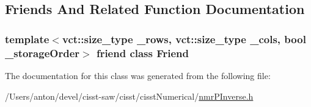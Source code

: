\subsection{Friends And Related Function Documentation}
\hypertarget{classnmr_p_inverse_fixed_size_data_a7f8321d57e81bc613d5dbef3410ba70e}{}
\subsubsection[{Friend}]{\setlength{\rightskip}{0pt plus 5cm}template$<$vct\+::size\+\_\+type \+\_\+rows, vct\+::size\+\_\+type \+\_\+cols, bool \+\_\+storage\+Order$>$ friend class {\bf Friend}\hspace{0.3cm}{\ttfamily [friend]}}\label{classnmr_p_inverse_fixed_size_data_a7f8321d57e81bc613d5dbef3410ba70e}


The documentation for this class was generated from the following file\+:\begin{DoxyCompactItemize}
\item 
/\+Users/anton/devel/cisst-\/saw/cisst/cisst\+Numerical/\hyperlink{nmr_p_inverse_8h}{nmr\+P\+Inverse.\+h}\end{DoxyCompactItemize}
